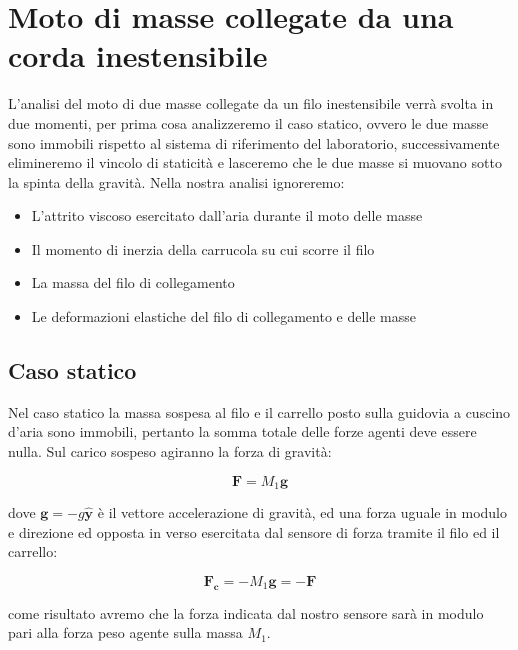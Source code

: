 \documentclass[a4paper,10pt,oneside]{article}
\begin{document}
\section*{Moto di masse collegate da una corda inestensibile}

L'analisi del moto di due masse collegate da un filo inestensibile verrà svolta in due momenti, per prima cosa analizzeremo il caso statico, ovvero le due masse sono immobili rispetto al sistema di riferimento del laboratorio, successivamente elimineremo il vincolo di staticità e lasceremo che le due masse si muovano sotto la spinta della gravità. Nella nostra analisi ignoreremo:
\begin{itemize}
 \item L'attrito viscoso esercitato dall'aria durante il moto delle masse
 \item Il momento di inerzia della carrucola su cui scorre il filo
 \item La massa del filo di collegamento
 \item Le deformazioni elastiche del filo di collegamento e delle masse
\end{itemize}


\subsection*{Caso statico}
Nel caso statico la massa sospesa al filo e il carrello posto sulla guidovia a cuscino d'aria sono immobili, pertanto la somma totale delle forze agenti deve essere nulla. Sul carico sospeso agiranno la forza di gravità:

\begin{equation}
 \mathbf{F}=M_1\mathbf{g}
\end{equation}

dove $\mathbf{g}=-g\hat{\mathbf{y}}$ è il vettore accelerazione di gravità, ed una forza uguale in modulo e direzione ed opposta in verso esercitata dal sensore di forza tramite il filo ed il carrello:

\begin{equation}
 \mathbf{F_c}=-M_1\mathbf{g}=-\mathbf{F}
\end{equation}

come risultato avremo che la forza indicata dal nostro sensore sarà in modulo pari alla forza peso agente sulla massa $M_1$.
\end{document}
